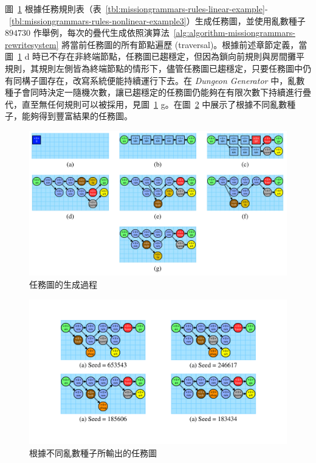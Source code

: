 圖~\ref{fig:mission-graph-generating-progress} 根據任務規則表（表~\ref{tbl:missiongrammars-rules-linear-example}-~\ref{tbl:missiongrammars-rules-nonlinear-example3}）生成任務圖，並使用亂數種子 $894730$ 作舉例，每次的疊代生成依照演算法~\ref{alg:algorithm-missiongrammars-rewritesystem} 將當前任務圖的所有節點遍歷 (traversal)。根據前述章節定義，當圖~\ref{fig:mission-graph-generating-progress} d 時已不存在非終端節點，任務圖已趨穩定，但因為鎖向前規則與房間攤平規則，其規則左側皆為終端節點的情形下，儘管任務圖已趨穩定，只要任務圖中仍有同構子圖存在，改寫系統便能持續運行下去。在 \textit{Dungeon Generator} 中，亂數種子會同時決定一隨機次數，讓已趨穩定的任務圖仍能夠在有限次數下持續進行疊代，直至無任何規則可以被採用，見圖~\ref{fig:mission-graph-generating-progress} g。在圖~\ref{fig:final-mission-graph} 中展示了根據不同亂數種子，能夠得到豐富結果的任務圖。

\begin{figure}[!htb]
  \begin{center}
    \includegraphics[width=1.0\textwidth]{figures/mission-graph-generating-progress.pdf}
    \caption{任務圖的生成過程}
    \label{fig:mission-graph-generating-progress}
  \end{center}
\end{figure}

\begin{figure}[!htb]
  \begin{center}
    \includegraphics[width=1.0\textwidth]{figures/final-mission-graph.pdf}
    \caption{根據不同亂數種子所輸出的任務圖}
    \label{fig:final-mission-graph}
  \end{center}
\end{figure}

